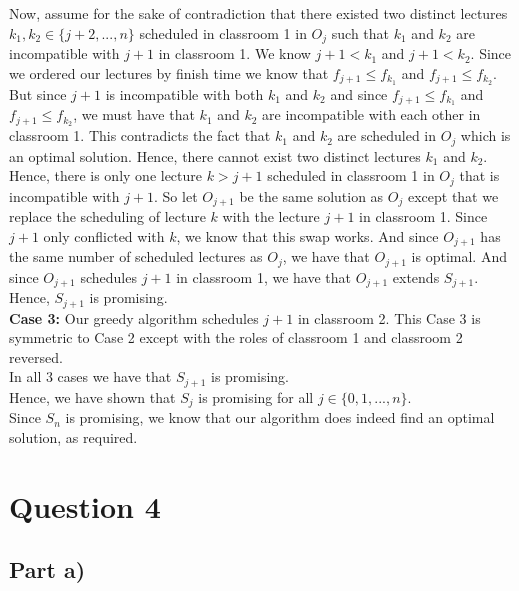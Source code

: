 \documentclass[12pt]{article}
\begin{document}
Now, assume for the sake of contradiction that there existed two distinct lectures $k_1, k_2 \in \{j+2,...,n\}$ scheduled in classroom 1 in $O_j$ such that $k_1$ and $k_2$ are incompatible with $j+1$ in classroom 1. We know $j+1 < k_1$ and $j+1 < k_2$. Since we ordered our lectures by finish time we know that $f_{j+1} \leq f_{k_1}$ and $f_{j+1} \leq f_{k_2}$. But since $j+1$ is incompatible with both $k_1$ and $k_2$ and since $f_{j+1} \leq f_{k_1}$ and $f_{j+1} \leq f_{k_2}$, we must have that $k_1$ and $k_2$ are incompatible with each other in classroom 1. This contradicts the fact that $k_1$ and $k_2$ are scheduled in $O_j$ which is an optimal solution. Hence, there cannot exist two distinct lectures $k_1$ and $k_2$. \\

Hence, there is only one lecture $k > j+1$ scheduled in classroom 1 in $O_j$ that is incompatible with $j+1$. So let $O_{j+1}$ be the same solution as $O_j$ except that we replace the scheduling of lecture $k$ with the lecture $j+1$ in classroom 1. Since $j+1$ only conflicted with $k$, we know that this swap works. And since $O_{j+1}$ has the same number of scheduled lectures as $O_j$, we have that $O_{j+1}$ is optimal. And since $O_{j+1}$ schedules $j+1$ in classroom 1, we have that $O_{j+1}$ extends $S_{j+1}$. Hence, $S_{j+1}$ is promising. \\

\textbf{Case 3:}  Our greedy algorithm schedules $j+1$ in classroom 2. This Case 3 is symmetric to Case 2 except with the roles of classroom 1 and classroom 2 reversed. \\

In all 3 cases we have that $S_{j+1}$ is promising. \\

Hence, we have shown that $S_j$ is promising for all $j \in \{0,1,...,n\}$. \\

Since $S_n$ is promising, we know that our algorithm does indeed find an optimal solution, as required.  

\newpage

\section*{Question 4}

\subsection*{Part a)}
\end{document}
